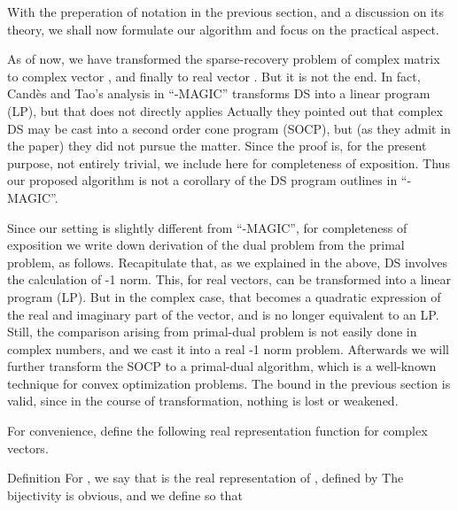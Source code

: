\startchapter [title={Simulation}]

With the preperation of notation in the previous section, and a discussion on its theory, we shall now formulate our algorithm and focus on the practical aspect.

As of now, we have transformed the sparse-recovery problem of complex matrix  to complex vector , and finally to real vector .
But it is not the end.
In fact, Cand\`es and Tao's analysis in ``-MAGIC'' transforms DS into a linear program (LP), but that does not directly applies
Actually they pointed out that complex DS may be cast into a second order cone program (SOCP), but (as they admit in the paper) they did not pursue the matter.
Since the proof is, for the present purpose, not entirely trivial, we include here for completeness of exposition.
Thus our proposed algorithm is not a corollary of the DS program outlines in ``-MAGIC''.

\startsection [title={Representation by Real Matrices}]

Since our setting is slightly different from ``-MAGIC'', for completeness of exposition we write down derivation of the dual problem from the primal problem, as follows.
Recapitulate that, as we explained in the above, DS involves the calculation of -1 norm.
This, for real vectors, can be transformed into a linear program (LP).
But in the complex case, that becomes a quadratic expression of the real and imaginary part of the vector, and is no longer equivalent to an LP.
Still, the comparison arising from primal-dual problem is not easily done in complex numbers, and we cast it into a real -1 norm problem.
Afterwards we will further transform the SOCP to a primal-dual algorithm, which is a well-known technique for convex optimization problems.
The bound in the previous section is valid, since in the course of transformation, nothing is lost or weakened.

For convenience, define the following real representation function for complex vectors.

\Result
{Definition}
{
For , we say that  is the real representation of , defined by
The bijectivity is obvious, and we define  so that
}

